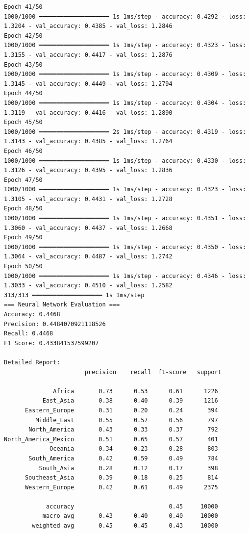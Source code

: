 \documentclass[
  letterpaper,
  DIV=11,
  numbers=noendperiod]{scrartcl}
\begin{document}
\begin{verbatim}
Epoch 41/50
1000/1000 ━━━━━━━━━━━━━━━━━━━━ 1s 1ms/step - accuracy: 0.4292 - loss: 1.3204 - val_accuracy: 0.4385 - val_loss: 1.2846
Epoch 42/50
1000/1000 ━━━━━━━━━━━━━━━━━━━━ 1s 1ms/step - accuracy: 0.4323 - loss: 1.3155 - val_accuracy: 0.4417 - val_loss: 1.2876
Epoch 43/50
1000/1000 ━━━━━━━━━━━━━━━━━━━━ 1s 1ms/step - accuracy: 0.4309 - loss: 1.3145 - val_accuracy: 0.4449 - val_loss: 1.2794
Epoch 44/50
1000/1000 ━━━━━━━━━━━━━━━━━━━━ 1s 1ms/step - accuracy: 0.4304 - loss: 1.3119 - val_accuracy: 0.4416 - val_loss: 1.2890
Epoch 45/50
1000/1000 ━━━━━━━━━━━━━━━━━━━━ 2s 1ms/step - accuracy: 0.4319 - loss: 1.3143 - val_accuracy: 0.4385 - val_loss: 1.2764
Epoch 46/50
1000/1000 ━━━━━━━━━━━━━━━━━━━━ 1s 1ms/step - accuracy: 0.4330 - loss: 1.3126 - val_accuracy: 0.4395 - val_loss: 1.2836
Epoch 47/50
1000/1000 ━━━━━━━━━━━━━━━━━━━━ 1s 1ms/step - accuracy: 0.4323 - loss: 1.3105 - val_accuracy: 0.4431 - val_loss: 1.2728
Epoch 48/50
1000/1000 ━━━━━━━━━━━━━━━━━━━━ 1s 1ms/step - accuracy: 0.4351 - loss: 1.3060 - val_accuracy: 0.4437 - val_loss: 1.2668
Epoch 49/50
1000/1000 ━━━━━━━━━━━━━━━━━━━━ 1s 1ms/step - accuracy: 0.4350 - loss: 1.3064 - val_accuracy: 0.4487 - val_loss: 1.2742
Epoch 50/50
1000/1000 ━━━━━━━━━━━━━━━━━━━━ 1s 1ms/step - accuracy: 0.4346 - loss: 1.3033 - val_accuracy: 0.4510 - val_loss: 1.2582
313/313 ━━━━━━━━━━━━━━━━━━━━ 1s 1ms/step
=== Neural Network Evaluation ===
Accuracy: 0.4468
Precision: 0.4484070921118526
Recall: 0.4468
F1 Score: 0.433841537599207

Detailed Report:
                       precision    recall  f1-score   support

              Africa       0.73      0.53      0.61      1226
           East_Asia       0.38      0.40      0.39      1216
      Eastern_Europe       0.31      0.20      0.24       394
         Middle_East       0.55      0.57      0.56       797
       North_America       0.43      0.33      0.37       792
North_America_Mexico       0.51      0.65      0.57       401
             Oceania       0.34      0.23      0.28       803
       South_America       0.42      0.59      0.49       784
          South_Asia       0.28      0.12      0.17       398
      Southeast_Asia       0.39      0.18      0.25       814
      Western_Europe       0.42      0.61      0.49      2375

            accuracy                           0.45     10000
           macro avg       0.43      0.40      0.40     10000
        weighted avg       0.45      0.45      0.43     10000
\end{verbatim}
\end{document}
